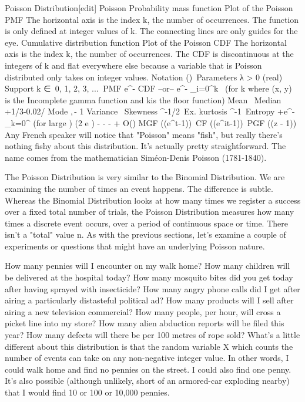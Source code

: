 Poisson Distribution[edit]
Poisson
Probability mass function
Plot of the Poisson PMF
The horizontal axis is the index k, the number of occurrences. The function is only defined at integer values of k. The connecting lines are only guides for the eye.
Cumulative distribution function
Plot of the Poisson CDF
The horizontal axis is the index k, the number of occurrences. The CDF is discontinuous at the integers of k and flat everywhere else because a variable that is Poisson distributed only takes on integer values.
Notation	(\lambda)\,
Parameters	λ > 0 (real)
Support	k ∈ { 0, 1, 2, 3, ... }
PMF	\cdot e^{-\lambda}
CDF	\! --or-- e^{-\lambda} \sum_{i=0}^{\lfloor k\rfloor} \ 
(for k where \Gamma(x, y)\,\! is the Incomplete gamma function and \lfloor k\rfloor is the floor function)
Mean	\lambda\,\!
Median	\approx\lfloor\lambda+1/3-0.02/\lambda\rfloor
Mode	\lfloor\lambda\rfloor,\,\lceil\lambda\rceil - 1
Variance	\lambda\,\!
Skewness	\lambda^{-1/2}\,
Ex. kurtosis	\lambda^{-1}\,
Entropy	\!+\!e^{-\lambda}\sum_{k=0}^\infty {}
(for large \lambda) \frac{1}{2}\log(2 \pi e \lambda) - \frac{1}{12 \lambda} - \frac{1}{24 \lambda^2} -
                     \frac{19}{360 \lambda^3} + O(\frac{1}{\lambda^4})
MGF	\exp(\lambda (e^{t}-1))\,
CF	\exp(\lambda (e^{it}-1))\,
PGF	 \exp(\lambda(z - 1))\,
Any French speaker will notice that "Poisson" means "fish", but really there's nothing fishy about this distribution. It's actually pretty straightforward. The name comes from the mathematician Siméon-Denis Poisson (1781-1840).

The Poisson Distribution is very similar to the Binomial Distribution. We are examining the number of times an event happens. The difference is subtle. Whereas the Binomial Distribution looks at how many times we register a success over a fixed total number of trials, the Poisson Distribution measures how many times a discrete event occurs, over a period of continuous space or time. There isn't a "total" value n. As with the previous sections, let's examine a couple of experiments or questions that might have an underlying Poisson nature.

How many pennies will I encounter on my walk home?
How many children will be delivered at the hospital today?
How many mosquito bites did you get today after having sprayed with insecticide?
How many angry phone calls did I get after airing a particularly distasteful political ad?
How many products will I sell after airing a new television commercial?
How many people, per hour, will cross a picket line into my store?
How many alien abduction reports will be filed this year?
How many defects will there be per 100 metres of rope sold?
What's a little different about this distribution is that the random variable X which counts the number of events can take on any non-negative integer value. In other words, I could walk home and find no pennies on the street. I could also find one penny. It's also possible (although unlikely, short of an armored-car exploding nearby) that I would find 10 or 100 or 10,000 pennies.

